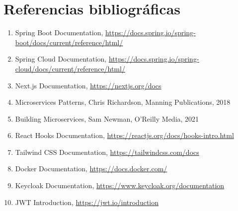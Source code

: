 \documentclass[12pt,a4paper]{report}
\begin{document}
\chapter{Referencias bibliográficas}
\begin{enumerate}
    \item Spring Boot Documentation, \url{https://docs.spring.io/spring-boot/docs/current/reference/html/}
    \item Spring Cloud Documentation, \url{https://docs.spring.io/spring-cloud/docs/current/reference/html/}
    \item Next.js Documentation, \url{https://nextjs.org/docs}
    \item Microservices Patterns, Chris Richardson, Manning Publications, 2018
    \item Building Microservices, Sam Newman, O'Reilly Media, 2021
    \item React Hooks Documentation, \url{https://reactjs.org/docs/hooks-intro.html}
    \item Tailwind CSS Documentation, \url{https://tailwindcss.com/docs}
    \item Docker Documentation, \url{https://docs.docker.com/}
    \item Keycloak Documentation, \url{https://www.keycloak.org/documentation}
    \item JWT Introduction, \url{https://jwt.io/introduction}
\end{enumerate}
\end{document}
